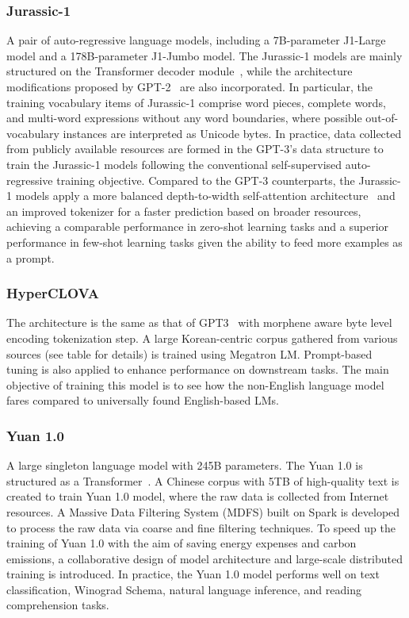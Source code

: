 \subsubsection{Jurassic-1~\cite{lieber2021jurassic}}
A pair of auto-regressive language models, including a 7B-parameter J1-Large model and a 178B-parameter J1-Jumbo model. The Jurassic-1 models are mainly structured on the Transformer decoder module~\cite{Transformers}, while the architecture modifications proposed by GPT-2~\cite{GPT-2} are also incorporated. In particular, the training vocabulary items of Jurassic-1 comprise word pieces, complete words, and multi-word expressions without any word boundaries, where possible out-of-vocabulary instances are interpreted as Unicode bytes. In practice, data collected from publicly available resources are formed in the GPT-3's data structure to train the Jurassic-1 models following the conventional self-supervised auto-regressive training objective. Compared to the GPT-3 counterparts, the Jurassic-1 models apply a more balanced depth-to-width self-attention architecture~\cite{levine2020limits} and an improved tokenizer for a faster prediction based on broader resources, achieving a comparable performance in zero-shot learning tasks and a superior performance in few-shot learning tasks given the ability to feed more examples as a prompt.

\subsubsection{HyperCLOVA~\cite{hyperclova}}
The architecture is the same as that of GPT3~\cite{GPT-3} with morphene aware byte level encoding tokenization step. A large Korean-centric corpus gathered from various sources (see table for details) is trained using Megatron LM. Prompt-based tuning is also applied to enhance performance on downstream tasks. The main objective of training this model is to see how the non-English language model fares compared to universally found English-based LMs.

\subsubsection{Yuan 1.0~\cite{wu2021yuan}}
A large singleton language model with 245B parameters. The Yuan 1.0 is structured as a Transformer~\cite{Transformers}. A Chinese corpus with 5TB of high-quality text is created to train Yuan 1.0 model, where the raw data is collected from Internet resources. A Massive Data Filtering System (MDFS) built on Spark is developed to process the raw data via coarse and fine filtering techniques. To speed up the training of Yuan 1.0 with the aim of saving energy expenses and carbon emissions, a collaborative design of model architecture and large-scale distributed training is introduced. In practice, the Yuan 1.0 model performs well on text classification, Winograd Schema, natural language inference, and reading comprehension tasks.

